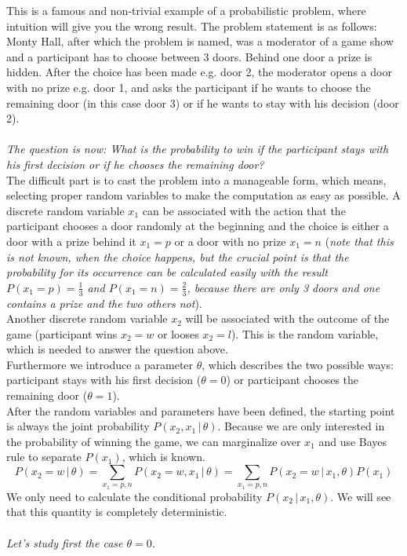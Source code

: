 \documentclass{tstextbook}
\begin{document}
\begin{example}

This is a famous and non-trivial example of a probabilistic problem, where intuition will give you the wrong result. The problem statement is as follows:\\

Monty Hall, after which the problem is named, was a moderator of a game show and a participant has to choose between 3 doors. Behind one door a prize is hidden. After the choice has been made e.g. door 2, the moderator opens a door with no prize e.g. door 1, and asks the participant if he wants to choose the remaining door (in this case door 3) or if he wants to stay with his decision (door 2).
\\
\\
\textit{The question is now: What is the probability to win if the participant stays with his first decision or if he chooses the remaining door?}\\

The difficult part is to cast the problem into a manageable form, which means, selecting proper random variables to make the computation as easy as possible. 
A discrete random variable $x_1$ can be associated with the action that the participant chooses a door randomly at the beginning and the choice is either a door with a prize behind it $x_1=p$ or a door with no prize $x_1=n$ (\textit{note that this is not known, when the choice happens, but the crucial point is that the probability for its occurrence can be calculated easily with the result $P(x_1=p)=\frac{1}{3}$ and $P(x_1=n)=\frac{2}{3}$, because there are only 3 doors and one contains a prize and the two others not}).\\ 

Another discrete random variable $x_2$ will be associated with the outcome of the game (participant wins $x_2=w$ or looses $x_2=l$). This is the random variable, which is needed to answer the question above.\\
 
Furthermore we introduce a parameter $\theta$, which describes the two possible ways: participant stays with his first decision ($\theta=0$) or participant chooses the remaining door ($\theta=1$).\\

After the random variables and parameters have been defined, the starting point is always the joint probability $P(x_2,x_1\,\vert\,\theta)$. Because we are only interested in the probability of winning the game, we can marginalize over $x_1$ and use Bayes rule to separate $P(x_1)$, which is known.
  \begin{equation}
    P(x_2=w\,\vert\,\theta)=\sum_{x_1=p,n}P(x_2=w,x_1\,\vert\,\theta)=
    \sum_{x_1=p,n}P(x_2=w\,\vert\,x_1,\theta)P(x_1)
  \end{equation}    
We only need to calculate the conditional probability $P(x_2\,\vert\,x_1,\theta)$. We will see that this quantity is completely deterministic. 
\\
\\
\textit{Let's study first the case $\theta=0$.}\\


\end{example}
\end{document}
